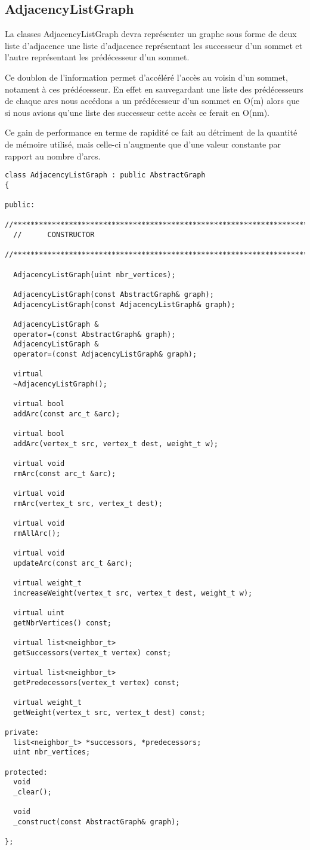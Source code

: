\subsection{AdjacencyListGraph}

La classes AdjacencyListGraph devra représenter un graphe sous forme
de deux liste d'adjacence une liste d'adjacence représentant les 
successeur d'un sommet et l'autre représentant les prédécesseur d'un sommet.

Ce doublon de l'information permet d'accéléré l'accès au voisin d'un sommet, 
notament à ces prédécesseur. En effet en sauvegardant une liste des prédécesseurs
de chaque arcs nous accédons a un prédécesseur d'un sommet en O(m) alors 
que si nous avions qu'une liste des successeur cette accès ce ferait en 
O(nm).

Ce gain de performance en terme de rapidité ce fait au détriment de la
quantité de mémoire utilisé, mais celle-ci n'augmente que d'une valeur
constante par rapport au nombre d'arcs.

\begin{verbatim}
class AdjacencyListGraph : public AbstractGraph
{

public:
  //************************************************************************************************
  //      CONSTRUCTOR
  //************************************************************************************************

  AdjacencyListGraph(uint nbr_vertices);

  AdjacencyListGraph(const AbstractGraph& graph);
  AdjacencyListGraph(const AdjacencyListGraph& graph);

  AdjacencyListGraph &
  operator=(const AbstractGraph& graph);
  AdjacencyListGraph &
  operator=(const AdjacencyListGraph& graph);

  virtual
  ~AdjacencyListGraph();

  virtual bool
  addArc(const arc_t &arc);

  virtual bool
  addArc(vertex_t src, vertex_t dest, weight_t w);

  virtual void
  rmArc(const arc_t &arc);

  virtual void
  rmArc(vertex_t src, vertex_t dest);

  virtual void
  rmAllArc();

  virtual void
  updateArc(const arc_t &arc);

  virtual weight_t
  increaseWeight(vertex_t src, vertex_t dest, weight_t w);

  virtual uint
  getNbrVertices() const;

  virtual list<neighbor_t>
  getSuccessors(vertex_t vertex) const;

  virtual list<neighbor_t>
  getPredecessors(vertex_t vertex) const;

  virtual weight_t
  getWeight(vertex_t src, vertex_t dest) const;

private:
  list<neighbor_t> *successors, *predecessors;
  uint nbr_vertices;

protected:
  void
  _clear();

  void
  _construct(const AbstractGraph& graph);

};
\end{verbatim}

